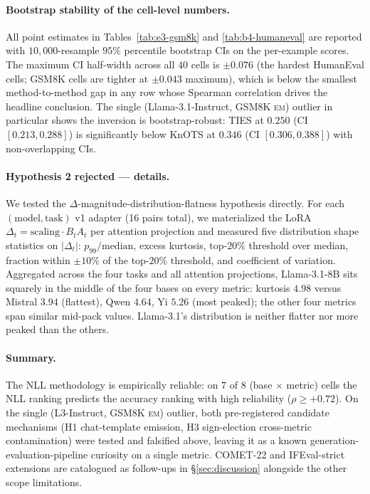 \paragraph{Bootstrap stability of the cell-level numbers.}
All point estimates in Tables~\ref{tab:e3-gsm8k} and
\ref{tab:b4-humaneval} are reported with $10{,}000$-resample
$95\%$ percentile bootstrap CIs on the per-example scores. The
maximum CI half-width across all $40$ cells is $\pm 0.076$ (the
hardest HumanEval cells; GSM8K cells are tighter at $\pm 0.043$
maximum), which is below the smallest method-to-method gap in any
row whose Spearman correlation drives the headline conclusion. The
single (Llama-3.1-Instruct, GSM8K \textsc{em}) outlier in particular
shows the inversion is bootstrap-robust: TIES at $0.250$
(CI $[0.213, 0.288]$) is significantly below KnOTS at $0.346$
(CI $[0.306, 0.388]$) with non-overlapping CIs.

\paragraph{Hypothesis 2 rejected --- details.}
We tested the $\Delta$-magnitude-distribution-flatness
hypothesis directly. For each $(\text{model}, \text{task})$ v1
adapter (16 pairs total), we materialized the LoRA $\Delta_t =
\mathrm{scaling} \cdot B_t A_t$ per attention projection and
measured five distribution shape statistics on $|\Delta_t|$:
$p_{99} / \mathrm{median}$, excess kurtosis, top-$20\%$
threshold over median, fraction within $\pm 10\%$ of the
top-$20\%$ threshold, and coefficient of variation. Aggregated
across the four tasks and all attention projections,
Llama-3.1-8B sits squarely in the middle of the four bases on
every metric: kurtosis $4.98$ versus Mistral $3.94$ (flattest),
Qwen $4.64$, Yi $5.26$ (most peaked); the other four metrics
span similar mid-pack values. Llama-3.1's distribution is
neither flatter nor more peaked than the others.

\paragraph{Summary.}
The NLL methodology is empirically reliable: on $7$ of $8$
(base $\times$ metric) cells the NLL ranking predicts the accuracy
ranking with high reliability ($\rho \geq +0.72$). On the single
(L3-Instruct, GSM8K \textsc{em}) outlier, both pre-registered
candidate mechanisms (H1 chat-template emission, H3 sign-election
cross-metric contamination) were tested and falsified above, leaving
it as a known generation-evaluation-pipeline curiosity on a single
metric. COMET-22 and IFEval-strict extensions are catalogued as
follow-ups in \S\ref{sec:discussion} alongside the other scope
limitations.

